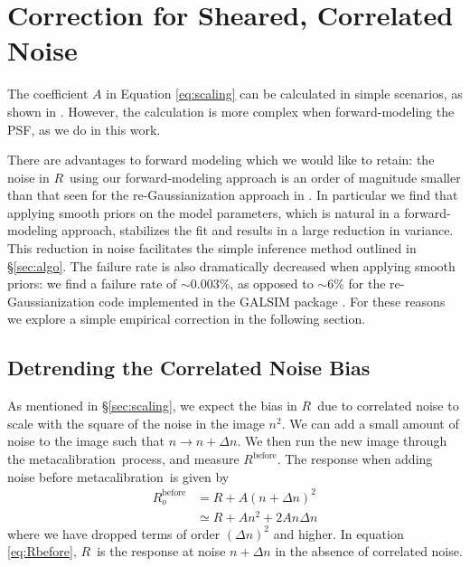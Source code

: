\documentclass[usegraphicx,usenatbib]{mn2e}
\newcommand{\mcal}{metacalibration}
\newcommand{\mcalR}{$R$}
\begin{document}
\section{Correction for Sheared, Correlated Noise} \label{sec:corr}

The coefficient $A$ in Equation \ref{eq:scaling} can be calculated in simple
scenarios, as shown in \cite{HirataCorrNoise}.  However, the calculation is
more complex when forward-modeling the PSF, as we do in this work.

There are advantages to forward modeling which we would like to retain: the
noise in \mcalR\ using our forward-modeling approach is an order of magnitude
smaller than that seen for the re-Gaussianization approach in \cite{HuffMcal}.
In particular we find that applying smooth priors on the model parameters,
which is natural in a forward-modeling approach, stabilizes the fit and results in
a large reduction in variance.  This reduction in noise facilitates the simple
inference method outlined in \S \ref{sec:algo}.  The failure rate is also
dramatically decreased when applying smooth priors:  we find a failure rate of
$\sim$0.003\%, as opposed to $\sim$6\% for the re-Gaussianization code
implemented in the GALSIM package \citep{GALSIM2015}.  For these reasons we
explore a simple empirical correction in the following section.


\subsection{Detrending the Correlated Noise Bias} \label{sec:detrend}

As mentioned in \S \ref{sec:scaling}, we expect the bias in \mcalR\ due to
correlated noise to scale with the square of the noise in the image $n^2$.  We
can add a small amount of noise to the image such that $n \rightarrow n +
\Delta n$. We then run the new image through the \mcal\ process, and measure
$R^{\mathrm{before}}$.
The response when adding noise before \mcal\ is given by
\begin{align}\label{eq:Rbefore}
    R_o^{\mathrm{before}} &= R + A (n + \Delta n)^2 \nonumber \\
       &\simeq R + A n^2 + 2 A n \Delta n
\end{align}
where we have dropped terms of order $(\Delta n)^2$ and higher.  In equation
\ref{eq:Rbefore}, \mcalR\ is the response at noise $n+\Delta n$ in the absence
of correlated noise.  
\end{document}
